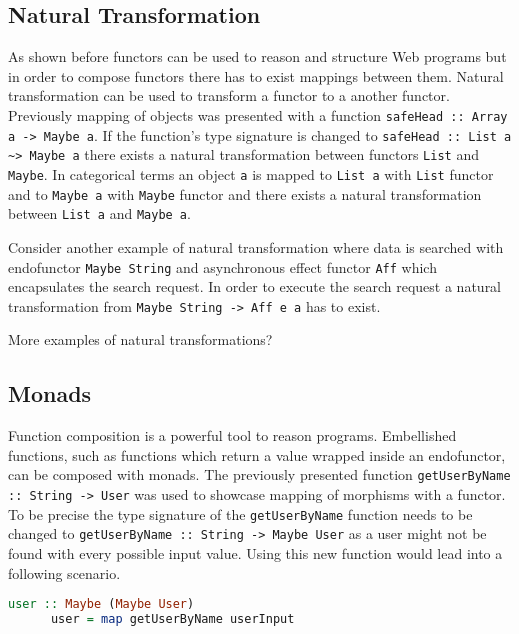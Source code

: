 \documentclass[article]{aaltoseries}
\begin{document}

  \subsection{Natural Transformation}
    As shown before functors can be used to reason and structure Web programs
    but in order to compose functors there has to exist mappings between them.
    Natural transformation can be used to transform a functor to a another
    functor. Previously mapping of objects was presented with a function
    \lstinline|safeHead :: Array a -> Maybe a|. If the function’s type signature
    is changed to \lstinline|safeHead :: List a ~> Maybe a| there exists a
    natural transformation between functors \lstinline|List| and
    \lstinline|Maybe|. In categorical terms an object \lstinline|a| is mapped to
    \lstinline|List a| with \lstinline|List| functor and to \lstinline|Maybe a| with
    \lstinline|Maybe| functor and there exists a natural transformation between
    \lstinline|List a| and \lstinline|Maybe a|.

    Consider another example of natural transformation where data is searched
    with endofunctor \lstinline|Maybe String| and asynchronous effect functor
    \lstinline|Aff| which encapsulates the search request. In order to execute
    the search request a natural transformation from
    \lstinline|Maybe String -> Aff e a| has to exist.

More examples of natural transformations?


  \subsection{Monads}
    Function composition is a powerful tool to reason programs. Embellished
    functions, such as functions which return a value wrapped inside an
    endofunctor, can be composed with monads. The previously presented function
    \lstinline|getUserByName :: String -> User| was used to showcase mapping of
    morphisms with a functor. To be precise the type signature of the
    \lstinline|getUserByName| function needs to be changed to
    \lstinline|getUserByName :: String -> Maybe User| as a user might not be
    found with every possible input value. Using this new function would lead
    into a following scenario.
 
    \begin{lstlisting}[language=Haskell]
      user :: Maybe (Maybe User)
      user = map getUserByName userInput
    \end{lstlisting}
 
\end{document}
